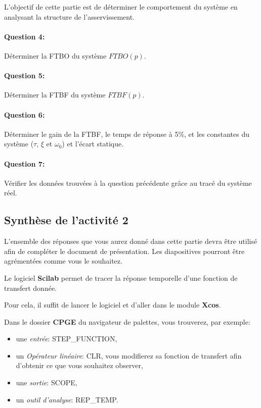 
L'objectif de cette partie est de déterminer le comportement du système en analysant la structure de l'asservissement.
~\

\paragraph{Question 4:} Déterminer la FTBO du système $FTBO(p)$.

\paragraph{Question 5:} Déterminer la FTBF du système $FTBF(p)$.

\paragraph{Question 6:} Déterminer le gain de la FTBF, le temps de réponse à 5\%, et les constantes du système ($\tau$, $\xi$ et $\omega_0$) et l'écart statique.

\paragraph{Question 7:} Vérifier les données trouvées à la question précédente grâce au tracé du système réel.
 
\subsection{Synthèse de l'activité 2}

L'ensemble des réponses que vous aurez donné dans cette partie devra être utilisé afin de compléter le document de présentation. Les diapositives pourront être agrémentées comme vous le souhaitez.
 
\ifdef{\public}{\cleardoublepage}{}


Le logiciel \textbf{Scilab} permet de tracer la réponse temporelle d'une fonction de transfert donnée.

Pour cela, il suffit de lancer le logiciel et d'aller dans le module \textbf{Xcos}.

Dans le dossier \textbf{CPGE} du navigateur de palettes, vous trouverez, par exemple:
\begin{itemize}
 \item une \textit{entrée}: STEP\_FUNCTION,
 \item un \textit{Opérateur linéaire}: CLR, vous modifierez sa fonction de transfert afin d'obtenir ce que vous souhaitez observer,
 \item une \textit{sortie}: SCOPE,
 \item un \textit{outil d'analyse}: REP\_TEMP.
\end{itemize}

